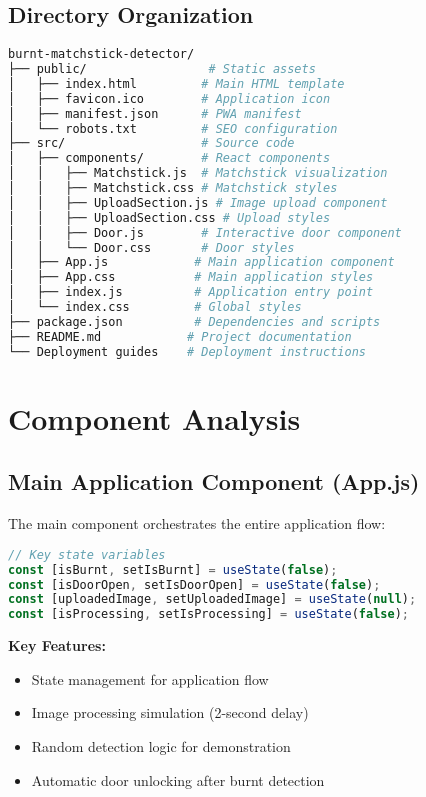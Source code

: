 \documentclass[12pt,a4paper]{article}
\begin{document}
\subsection{Directory Organization}
\begin{lstlisting}[language=bash]
burnt-matchstick-detector/
├── public/                 # Static assets
│   ├── index.html         # Main HTML template
│   ├── favicon.ico        # Application icon
│   ├── manifest.json      # PWA manifest
│   └── robots.txt         # SEO configuration
├── src/                   # Source code
│   ├── components/        # React components
│   │   ├── Matchstick.js  # Matchstick visualization
│   │   ├── Matchstick.css # Matchstick styles
│   │   ├── UploadSection.js # Image upload component
│   │   ├── UploadSection.css # Upload styles
│   │   ├── Door.js        # Interactive door component
│   │   └── Door.css       # Door styles
│   ├── App.js            # Main application component
│   ├── App.css           # Main application styles
│   ├── index.js          # Application entry point
│   └── index.css         # Global styles
├── package.json          # Dependencies and scripts
├── README.md            # Project documentation
└── Deployment guides    # Deployment instructions
\end{lstlisting}

\section{Component Analysis}

\subsection{Main Application Component (App.js)}
The main component orchestrates the entire application flow:

\begin{lstlisting}[language=javascript]
// Key state variables
const [isBurnt, setIsBurnt] = useState(false);
const [isDoorOpen, setIsDoorOpen] = useState(false);
const [uploadedImage, setUploadedImage] = useState(null);
const [isProcessing, setIsProcessing] = useState(false);
\end{lstlisting}

\textbf{Key Features:}
\begin{itemize}
    \item State management for application flow
    \item Image processing simulation (2-second delay)
    \item Random detection logic for demonstration
    \item Automatic door unlocking after burnt detection
\end{itemize}
\end{document}
